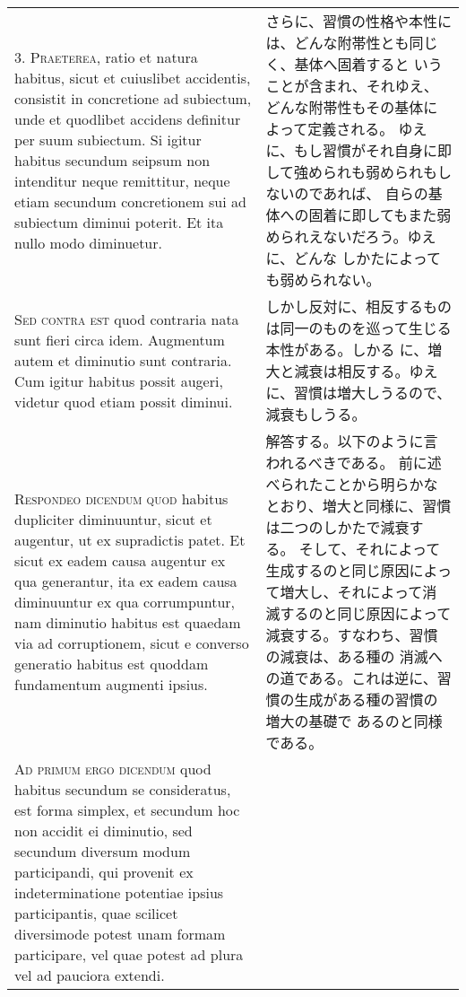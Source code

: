\documentclass[10pt]{jsarticle} %
\begin{document}
\begin{longtable}{p{21em}p{21em}}
\\



3. {\scshape Praeterea}, ratio et natura habitus, sicut et cuiuslibet accidentis,
consistit in concretione ad subiectum, unde et quodlibet accidens
definitur per suum subiectum. Si igitur habitus secundum seipsum non
intenditur neque remittitur, neque etiam secundum concretionem sui ad
subiectum diminui poterit. Et ita nullo modo diminuetur.

&

さらに、習慣の性格や本性には、どんな附帯性とも同じく、基体へ固着すると
 いうことが含まれ、それゆえ、どんな附帯性もその基体によって定義される。
ゆえに、もし習慣がそれ自身に即して強められも弱められもしないのであれば、
 自らの基体への固着に即してもまた弱められえないだろう。ゆえに、どんな
 しかたによっても弱められない。

\\



{\scshape Sed contra est} quod contraria nata sunt fieri circa idem. Augmentum
autem et diminutio sunt contraria. Cum igitur habitus possit augeri,
videtur quod etiam possit diminui.

&

しかし反対に、相反するものは同一のものを巡って生じる本性がある。しかる
 に、増大と減衰は相反する。ゆえに、習慣は増大しうるので、減衰もしうる。

\\



{\scshape Respondeo dicendum quod} habitus dupliciter diminuuntur, sicut et
augentur, ut ex supradictis patet. Et sicut ex eadem causa augentur ex
qua generantur, ita ex eadem causa diminuuntur ex qua corrumpuntur,
nam diminutio habitus est quaedam via ad corruptionem, sicut e
converso generatio habitus est quoddam fundamentum augmenti ipsius.

&

解答する。以下のように言われるべきである。
前に述べられたことから明らかなとおり、増大と同様に、習慣は二つのしかたで減衰する。
そして、それによって生成するのと同じ原因によって増大し、それによって消
 滅するのと同じ原因によって減衰する。すなわち、習慣の減衰は、ある種の
 消滅への道である。これは逆に、習慣の生成がある種の習慣の増大の基礎で
 あるのと同様である。

\\



{\scshape Ad primum ergo dicendum} quod habitus secundum se consideratus, est
forma simplex, et secundum hoc non accidit ei diminutio, sed secundum
diversum modum participandi, qui provenit ex indeterminatione
potentiae ipsius participantis, quae scilicet diversimode potest unam
formam participare, vel quae potest ad plura vel ad pauciora extendi.


\end{longtable}
\end{document}
